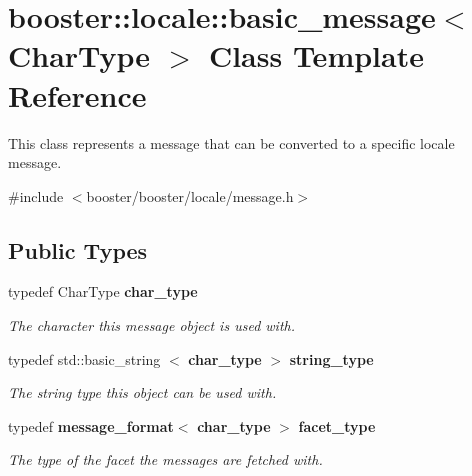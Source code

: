 \section{booster\-:\-:locale\-:\-:basic\-\_\-message$<$ \-Char\-Type $>$ \-Class \-Template \-Reference}
\label{classbooster_1_1locale_1_1basic__message}


\-This class represents a message that can be converted to a specific locale message.  




{\ttfamily \#include $<$booster/booster/locale/message.\-h$>$}

\subsection*{\-Public \-Types}
\begin{DoxyCompactItemize}
\item 
typedef \-Char\-Type {\bf char\-\_\-type}\label{group__message_ga5cb546ceb92830ddf7ea2913e6651b9e}

\begin{DoxyCompactList}\small\item\em \-The character this message object is used with. \end{DoxyCompactList}\item 
typedef std\-::basic\-\_\-string\*
$<$ {\bf char\-\_\-type} $>$ {\bf string\-\_\-type}\label{group__message_ga90b2267af78f4df23fb621e3c1443707}

\begin{DoxyCompactList}\small\item\em \-The string type this object can be used with. \end{DoxyCompactList}\item 
typedef {\bf message\-\_\-format}$<$ {\bf char\-\_\-type} $>$ {\bf facet\-\_\-type}\label{group__message_ga07188bff8c00be4a1b81323d45525b65}

\begin{DoxyCompactList}\small\item\em \-The type of the facet the messages are fetched with. \end{DoxyCompactList}\end{DoxyCompactItemize}
